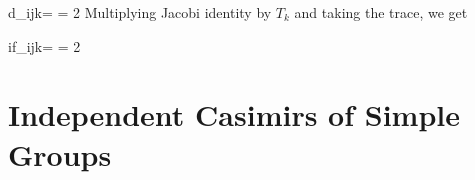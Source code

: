 \beq
d_{ijk}=
\bcen
{}
\ecen
=
2
\bcen
{}
\ecen
\eeq
Multiplying Jacobi identity by $T_k$
and taking the trace, we get

\beq
if_{ijk}=
\bcen
{}
\ecen
=
2
\bcen
{}
\ecen
\eeq

\section{Independent Casimirs of Simple Groups}